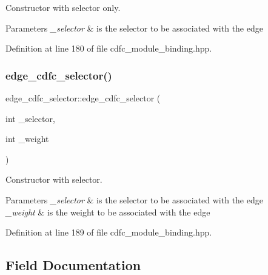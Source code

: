 Constructor with selector only. 


\begin{DoxyParams}{Parameters}
{\em \+\_\+selector} & is the selector to be associated with the edge \\
\hline
\end{DoxyParams}


Definition at line 180 of file cdfc\+\_\+module\+\_\+binding.\+hpp.

\mbox{\label{structedge__cdfc__selector_a106aea02dc81643ab757966c2b6b8f69}} 
\subsubsection{\texorpdfstring{edge\+\_\+cdfc\+\_\+selector()}{edge\_cdfc\_selector()}\hspace{0.1cm}{\footnotesize\ttfamily [3/3]}}
{\footnotesize\ttfamily edge\+\_\+cdfc\+\_\+selector\+::edge\+\_\+cdfc\+\_\+selector (\begin{DoxyParamCaption}\item[{int}]{\+\_\+selector,  }\item[{int}]{\+\_\+weight }\end{DoxyParamCaption})\hspace{0.3cm}{\ttfamily [inline]}}



Constructor with selector. 


\begin{DoxyParams}{Parameters}
{\em \+\_\+selector} & is the selector to be associated with the edge \\
\hline
{\em \+\_\+weight} & is the weight to be associated with the edge \\
\hline
\end{DoxyParams}


Definition at line 189 of file cdfc\+\_\+module\+\_\+binding.\+hpp.



\subsection{Field Documentation}
\mbox{\label{structedge__cdfc__selector_aa8dd2e707440b475d207bd5e52b74274}} 
